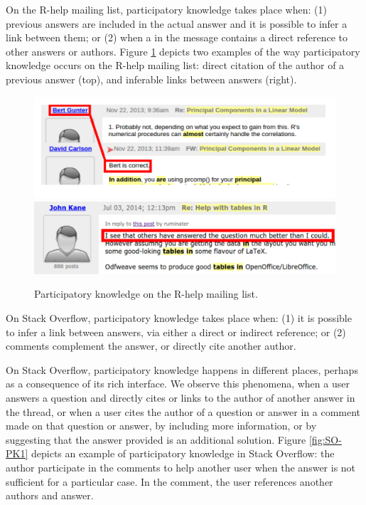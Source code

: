 \documentclass{sig-alternate-05-2015}
\begin{document}
	On the R-help mailing list, participatory knowledge takes place when:
	(1) previous answers are included in the actual answer and it is possible to infer a link between them; or
	(2) when a in the message contains a direct reference to other answers or authors.
	Figure \ref{fig:ML-PK1} depicts two examples of the way participatory knowledge occurs on the R-help mailing list:
	direct citation of the author of a previous answer (top), and inferable links between answers (right).

	
	\begin{figure}[!htb]
		\centering
		\includegraphics[width=\columnwidth]{Figures/ML-PKimg2}
		\includegraphics[width=\columnwidth]{Figures/ML-PKimg11}
		\caption[Participatory knowledge on the R-help mailing list.]{Participatory knowledge on the R-help mailing list.}
		\label{fig:ML-PK1}
	\end{figure}

	On Stack Overflow, participatory knowledge takes place when:
	(1) it is possible to infer a link between answers, via either a direct or indirect reference; or
	(2) comments complement the answer, or directly cite another author.

	On Stack Overflow, participatory knowledge happens in different places, perhaps as a consequence of its rich interface.
	We observe this phenomena, when a user answers a question and directly cites or links to the author of another answer in the thread, or when a user cites the author of a question or answer in a comment made on that question or answer, by including more information, or by suggesting that the answer provided is an additional solution.
	Figure \ref{fig:SO-PK1} depicts an example of participatory knowledge in Stack Overflow: the author participate in the comments to help another user when the answer is not sufficient for a particular case.
	In the comment, the user references another authors and answer.
\end{document}
